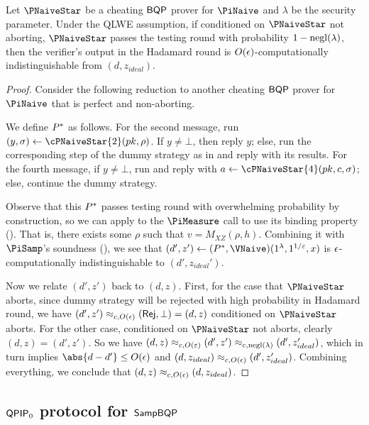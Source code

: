 \begin{lemma}
	\label{lem:naive-qpip0-binding}
	Let $\PNaiveStar$ be a cheating $\operatorname{\mathsf{BQP}}$ prover for $\PiNaive$ and $\lambda$ be the security parameter.
	Under the QLWE assumption, if conditioned on $\PNaiveStar$ not aborting, $\PNaiveStar$ passes the testing round with probability $1-\operatorname{negl}(\lambda)$,
	then the verifier's output in the Hadamard round is $O(\epsilon)$-computationally indistinguishable from $(d, z_{ideal})$.
\end{lemma}
\begin{proof}
	Consider the following reduction to another cheating $\operatorname{\mathsf{BQP}}$ prover for $\PiNaive$ that is perfect and non-aborting.

	We define $P^*$ as follows.
	For the second message, run $(y, \sigma)\leftarrow\cPNaiveStar{2}(pk, \rho)$.
	If $y\ne\bot$, then reply $y$;
	else, run the corresponding step of the dummy strategy as in  and reply with its results.
	For the fourth message, if $y\ne\bot$, run and reply with $a\leftarrow\cPNaiveStar{4}(pk, c, \sigma)$;
	else, continue the dummy strategy.

	Observe that this $P^*$ passes testing round with overwhelming probability by construction,
	so we can apply  to the $\PiMeasure$ call to use its binding property ().
	That is, there exists some $\rho$ such that $v=M_{XZ}(\rho, h)$.
	Combining it with $\PiSamp$'s soundness (),
	we see that $(d', z')\leftarrow(\Pstar, \VNaive)(1^\lambda, 1^{1/\varepsilon}, x)$ is $\epsilon$-computationally indistinguishable to $(d', z_{ideal}')$.

	Now we relate $(d', z')$ back to $(d, z)$.
	First, for the case that $\PNaiveStar$ aborts, since dummy strategy will be rejected with high probability in Hadamard round,
	we have $(d', z')\approx_{c, O(\epsilon)}(\mathsf{Rej}, \bot)=(d, z)$ conditioned on $\PNaiveStar$ aborts.
	For the other case, conditioned on $\PNaiveStar$ not aborts, clearly $(d, z)=(d', z')$.
	So we have $(d, z)\approx_{c, O(\varepsilon)}(d', z')\approx_{c, \operatorname{negl}(\lambda)}(d', z_{ideal}')$,
	which in turn implies $\abs{d-d'}\leq O(\eps)$
	and $(d, z_{ideal})\approx_{c, O(\epsilon)}(d', z_{ideal}')$.
	Combining everything, we conclude that $(d, z)\approx_{c, O(\epsilon)}(d, z_{ideal})$.
\end{proof}

\subsection{$\operatorname{\mathsf{QPIP}}_0$ protocol for $\operatorname{\mathsf{SampBQP}}$} \label{sec:qpip0}

